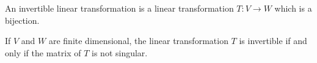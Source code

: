 \documentclass[12pt]{article}
\begin{document}
An invertible linear transformation is a linear transformation $T: V \longrightarrow W$ which is a bijection.

If $V$ and $W$ are finite dimensional, the linear transformation $T$ is invertible if and only if the matrix of $T$ is not singular.
\end{document}
